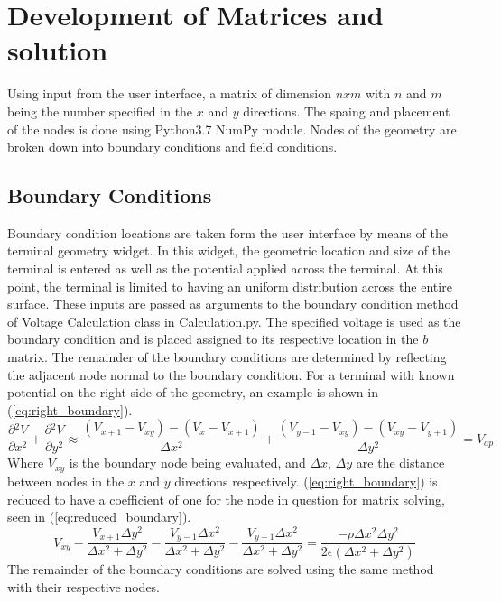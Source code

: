 \documentclass{article}[12pt]
\begin{document}
\section{Development of Matrices and solution}
	Using input from the user interface, a matrix of dimension $nxm$ with $n$ and $m$ being the number specified in the $x$ and $y$ directions. The spaing and placement of the nodes is done using Python3.7 NumPy module. Nodes of the geometry are broken down into boundary conditions and field conditions. 
\subsection{Boundary Conditions}
	Boundary condition locations are taken form the user interface by means of the terminal geometry widget. In this widget, the geometric location and size of the terminal is entered as well as the potential applied across the terminal. At this point, the terminal is limited to having an uniform distribution across the entire surface. These inputs are passed as arguments to the boundary condition method of Voltage Calculation class in Calculation.py. The specified voltage is used as the boundary condition and is placed assigned to its respective location in the $b$ matrix. The remainder of the boundary conditions are determined by reflecting the adjacent node normal to the boundary condition. For a terminal with known potential on the right side of the geometry, an example is shown in (\ref{eq:right_boundary}).
		\begin{equation}
		\frac{\partial{^2V}}{\partial{x^2}}+\frac{\partial{^2V}}{\partial{y^2}} \approx \frac{\left(V_{x+1}-V_{xy}\right)-\left(V_x-V_{x+1}\right)}{\Delta x^2}+\frac{\left(V_{y-1}-V_{xy}\right)-\left(V_{xy}-V_{y+1}\right)}{\Delta y^2}=V_{ap}
		\label{eq:right_boundary}
	\end{equation}
Where $V_{xy}$ is the boundary node being evaluated, and $\Delta x$, $\Delta y$ are the distance between nodes in the $x$ and $y$ directions respectively. (\ref{eq:right_boundary}) is reduced to have a coefficient of one for the node in question for matrix solving, seen in (\ref{eq:reduced_boundary}).
	\begin{equation}
		V_{xy}-\frac{V_{x+1}\Delta y^2}{\Delta x^2+\Delta y^2}-\frac{V_{y-1}\Delta x^2}{\Delta  x^2+\Delta y^2}-\frac{V_{y+1}\Delta x^2}{\Delta  x^2+\Delta y^2}=\frac{-\rho \Delta  x^2 \Delta y^2}{2\epsilon\left(\Delta x^2+\Delta y^2\right)}
		\label{eq:reduced_boundary}
	\end{equation}
The remainder of the boundary conditions are solved using the same method with their respective nodes. 
\end{document}
